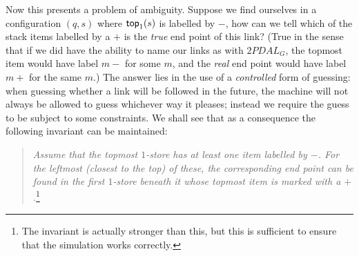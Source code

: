 Now this presents a problem of ambiguity. Suppose we find ourselves in
a configuration $(q,s)$ where ${\sf top}_1(s)$ is labelled by $-$, how
can we tell which of the stack items labelled by a $+$ is the
\emph{true} end point of this link? (True in the sense that if we did
have the ability to name our links as with $2PDAL_G$, the topmost
item would have label $m-$ for some $m$, and the \emph{real} end point
would have label $m+$ for the same $m$.) The answer lies in the use of
a \emph{controlled} form of guessing: when guessing whether a link
will be followed in the future, the machine will not always be allowed
to guess whichever way it pleases; instead we require the guess to be
subject to some constraints. We shall see that as a consequence the
following invariant can be maintained:
\begin{quote}
\emph{Assume that the topmost $1$-store has at least one item
labelled by $-$. For the leftmost (closest to the top) of these, the
corresponding end point can be found in the first $1$-store beneath it
whose topmost item is marked with a $+$.}\footnote{The invariant is
actually stronger than this, but this is sufficient to ensure that the
simulation works correctly.}
\end{quote}


